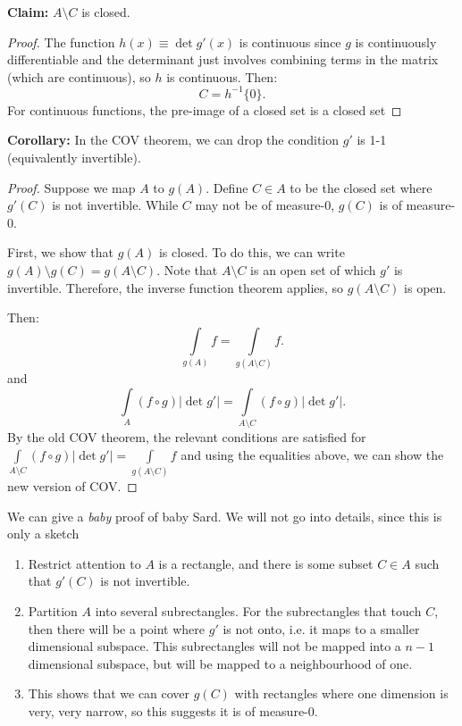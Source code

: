 \documentclass{article}
\numberwithin{equation}{section}
\begin{document}
\textbf{Claim:} $A \setminus C$ is closed.
\begin{proof}
    The function $h(x) \equiv \det g'(x)$ is continuous since $g$ is continuously differentiable and the determinant just involves combining terms in the matrix (which are continuous), so $h$ is continuous. Then:
    \begin{equation}
        C = h^{-1}\{0\}.
    \end{equation} 
    For continuous functions, the pre-image of a closed set is a closed set
\end{proof}

\textbf{Corollary:} In the COV theorem, we can drop the condition $g'$ is 1-1 (equivalently invertible).
\begin{proof}
    Suppose we map $A$ to $g(A).$ Define $C \in A$ to be the closed set where $g'(C)$ is not invertible. While $C$ may not be of measure-0, $g(C)$ is of measure-0.

    First, we show that $g(A)$ is closed. To do this, we can write $g(A) \setminus g(C) = g(A\setminus C).$ Note that $A\setminus C$ is an open set of which $g'$ is invertible. Therefore, the inverse function theorem applies, so $g(A\setminus C)$ is open.
    
    Then:
    \begin{equation}
        \int\limits_{g(A)} f = \int\limits_{g(A\setminus C)} f.
    \end{equation}
    and
    \begin{equation}
        \int\limits_{A}(f\circ g)|\det g'| = \int\limits_{A\setminus C}(f\circ g)|\det g'|.
    \end{equation}
    By the old COV theorem, the relevant conditions are satisfied for $\int\limits_{A\setminus C}(f\circ g)|\det g'| = \int\limits_{g(A\setminus C)} f$ and using the equalities above, we can show the new version of COV.
\end{proof}
We can give a \textit{baby} proof of baby Sard. We will not go into details, since this is only a sketch
\begin{enumerate}
    \item Restrict attention to $A$ is a rectangle, and there is some subset $C\in A$ such that $g'(C)$ is not invertible.
    \item Partition $A$ into several subrectangles. For the subrectangles that touch $C$, then there will be a point where $g'$ is not onto, i.e. it maps to a smaller dimensional subspace. This subrectangles will not be mapped into a $n-1$ dimensional subspace, but will be mapped to a neighbourhood of one.
    \item This shows that we can cover $g(C)$ with rectangles where one dimension is very, very narrow, so this suggests it is of measure-$0$. 
\end{enumerate}
\end{document}
